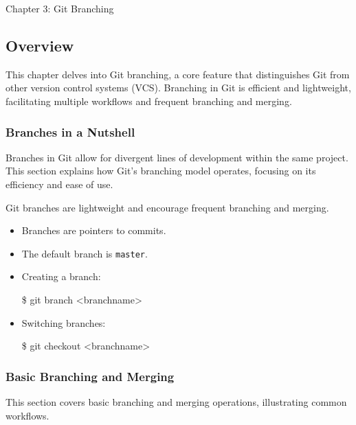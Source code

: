 \begin{notes}{Chapter 3: Git Branching}
    \subsection*{Overview}

    This chapter delves into Git branching, a core feature that distinguishes Git from other version control systems (VCS). Branching in Git is efficient and lightweight, facilitating multiple workflows 
    and frequent branching and merging.
    
    \subsubsection*{Branches in a Nutshell}
    
    Branches in Git allow for divergent lines of development within the same project. This section explains how Git's branching model operates, focusing on its efficiency and ease of use.
    
    \begin{highlight}
    
        Git branches are lightweight and encourage frequent branching and merging.
        
        \begin{itemize}
            \item Branches are pointers to commits.
            \item The default branch is \texttt{master}.
            \item Creating a branch:
    \begin{code}[Bash]
    \$ git branch <branchname>
    \end{code}
            \item Switching branches:
    \begin{code}[Bash]
    \$ git checkout <branchname>
    \end{code}
        \end{itemize}
    
    \end{highlight}
    
    \subsubsection*{Basic Branching and Merging}
    
    This section covers basic branching and merging operations, illustrating common workflows.
    

\end{notes}
